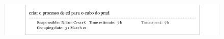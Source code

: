 \begin{apendicesenv}
\begin{figure}[h!]
\centering
\includegraphics[keepaspectratio=false,scale=0.70]{figuras/figuras_nilton/kanban5.png}
\end{figure}

\end{apendicesenv}